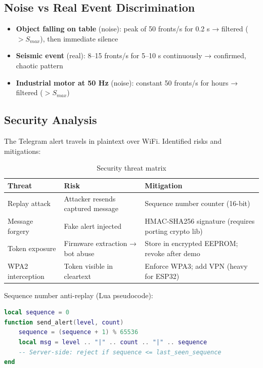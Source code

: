 \documentclass[11pt,a4paper]{article}
\begin{document}
\subsection{Noise vs Real Event Discrimination}

\begin{itemize}[noitemsep]
  \item \textbf{Object falling on table} (noise): peak of 50 fronts/s for 0.2 s → filtered ($> S_{max}$), then immediate silence
  \item \textbf{Seismic event} (real): 8--15 fronts/s for 5--10 s continuously → confirmed, chaotic pattern
  \item \textbf{Industrial motor at 50 Hz} (noise): constant 50 fronts/s for hours → filtered ($> S_{max}$)
\end{itemize}

\subsection{Security Analysis}

The Telegram alert travels in plaintext over WiFi. Identified risks and mitigations:

\begin{table}[h!]
\centering
\begin{tabular}{p{3.5cm}p{4cm}p{5.5cm}}
\toprule
\textbf{Threat} & \textbf{Risk} & \textbf{Mitigation} \\
\midrule
Replay attack & Attacker resends captured message & Sequence number counter (16-bit) \\
Message forgery & Fake alert injected & HMAC-SHA256 signature (requires porting crypto lib) \\
Token exposure & Firmware extraction → bot abuse & Store in encrypted EEPROM; revoke after demo \\
WPA2 interception & Token visible in cleartext & Enforce WPA3; add VPN (heavy for ESP32) \\
\bottomrule
\end{tabular}
\caption{Security threat matrix}
\end{table}

Sequence number anti-replay (Lua pseudocode):
\begin{lstlisting}[language=Lua, caption={Anti-replay sequence counter}]
local sequence = 0
function send_alert(level, count)
    sequence = (sequence + 1) % 65536
    local msg = level .. "|" .. count .. "|" .. sequence
    -- Server-side: reject if sequence <= last_seen_sequence
end
\end{lstlisting}
\end{document}
